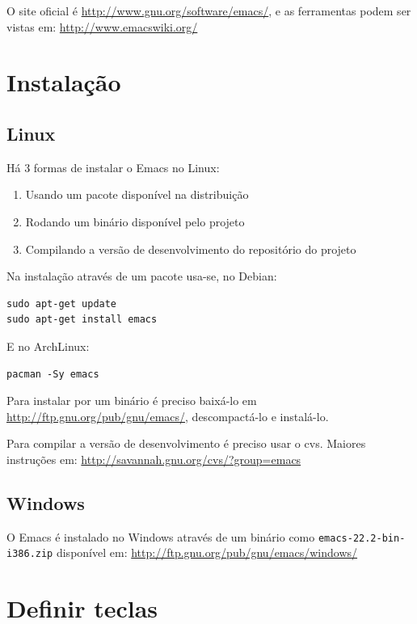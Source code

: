 \documentclass[12pt,brazil]{book}
\begin{document}
O site oficial é \url{http://www.gnu.org/software/emacs/}, e as
ferramentas podem ser vistas em: \url{http://www.emacswiki.org/}

\section{Instalação}
\label{sec:instalacao-7}

\subsection{Linux}
\label{sec:linux}

Há 3 formas de instalar o Emacs no Linux:

\begin{enumerate}
\item Usando um pacote disponível na distribuição
\item Rodando um binário disponível pelo projeto
\item Compilando a versão de desenvolvimento do repositório do projeto
\end{enumerate}

Na instalação através de um pacote usa-se, no Debian:

\begin{verbatim}
sudo apt-get update
sudo apt-get install emacs
\end{verbatim}

E no ArchLinux:

\begin{verbatim}
pacman -Sy emacs
\end{verbatim}

Para instalar por um binário é preciso baixá-lo em
\url{http://ftp.gnu.org/pub/gnu/emacs/}, descompactá-lo e instalá-lo.

Para compilar a versão de desenvolvimento é preciso usar o
cvs. Maiores instruções em:
\url{http://savannah.gnu.org/cvs/?group=emacs}

\subsection{Windows}
\label{sec:windows}

O Emacs é instalado no Windows através de um binário como
\texttt{emacs-22.2-bin-i386.zip} disponível em:
\url{http://ftp.gnu.org/pub/gnu/emacs/windows/}


\section{Definir teclas}
\label{sec:teclas}
\end{document}
